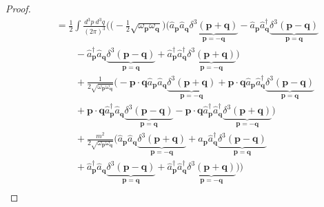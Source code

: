 \begin{proof}
\begin{equation*}
        \begin{aligned}
            \phantom{\hat H} & = \frac{1}{2} \int \frac{d^3 p ~d^3 q}{(2\pi)^3} \Big (\Big (- \frac{1}{2} \sqrt{\omega_{\mathbf p} \omega_{\mathbf q}} \Big ) \Big (\hat a_{\mathbf p} \hat a_{\mathbf q} \underbrace{\delta^3 (\mathbf p + \mathbf q)}_{\mathbf p = - \mathbf q} - \hat a_{\mathbf p} \hat a_{\mathbf q}^\dagger \underbrace{\delta^3 (\mathbf p - \mathbf q)}_{\mathbf p = \mathbf q} \\ & \qquad - \hat a_{\mathbf p}^\dagger \hat a_{\mathbf q} \underbrace{\delta^3 (\mathbf p - \mathbf q)}_{\mathbf p = \mathbf q} + \hat a_{\mathbf p}^\dagger \hat a_{\mathbf q}^\dagger \underbrace{\delta^3 (\mathbf p + \mathbf q)}_{\mathbf p = - \mathbf q} \Big) \\ & \qquad + \frac{1}{2 \sqrt{\omega_{\mathbf p} \omega_{\mathbf q}}} \Big (- \mathbf p \cdot \mathbf q \hat a_{\mathbf p} \hat a_{\mathbf q} \underbrace{\delta^3 (\mathbf p + \mathbf q)}_{\mathbf p = - \mathbf q} + \mathbf p \cdot \mathbf q \hat a_{\mathbf p} \hat a_{\mathbf q}^\dagger \underbrace{\delta^3 (\mathbf p - \mathbf q)}_{\mathbf p = \mathbf q} \\ & \qquad + \mathbf p \cdot \mathbf q \hat a_{\mathbf p}^\dagger \hat a_{\mathbf q} \underbrace{\delta^3 (\mathbf p - \mathbf q)}_{\mathbf p = \mathbf q} - \mathbf p \cdot \mathbf q \hat a_{\mathbf p}^\dagger \hat a_{\mathbf q}^\dagger \underbrace{\delta^3 (\mathbf p + \mathbf q)}_{\mathbf p = - \mathbf q} \Big) \\ & \qquad + \frac{m^2}{2 \sqrt{\omega_{\mathbf p} \omega_{\mathbf q}}} \Big (\hat a_{\mathbf p} \hat a_{\mathbf q} \underbrace{\delta^3 (\mathbf p + \mathbf q)}_{\mathbf p = - \mathbf q} + \hat a_{\mathbf p} \hat a_{\mathbf q}^\dagger \underbrace{\delta^3 (\mathbf p - \mathbf q)}_{\mathbf p = \mathbf q} \\ & \qquad + \hat a_{\mathbf p}^\dagger \hat a_{\mathbf q} \underbrace{\delta^3 (\mathbf p - \mathbf q)}_{\mathbf p = \mathbf q} + \hat a_{\mathbf p}^\dagger \hat a_{\mathbf q}^\dagger \underbrace{\delta^3 (\mathbf p + \mathbf q)}_{\mathbf p = - \mathbf q} \Big) \Big)  
        \end{aligned}
        \end{equation*}
        \begin{equation*}
        \begin{aligned}

\end{aligned}
\end{equation*}
\end{proof}
